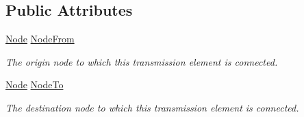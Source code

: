 \subsection*{Public Attributes}
\begin{DoxyCompactItemize}
\item 
\hyperlink{class_power_system_planning_1_1_node}{Node} \hyperlink{class_power_system_planning_1_1_transmission_element_a361691d8c6720d32ab4e2be4e77233b3}{Node\+From}
\begin{DoxyCompactList}\small\item\em The origin node to which this transmission element is connected. \end{DoxyCompactList}\item 
\hyperlink{class_power_system_planning_1_1_node}{Node} \hyperlink{class_power_system_planning_1_1_transmission_element_adfffaeb9dab17f7f2bafec0f319b2fe5}{Node\+To}
\begin{DoxyCompactList}\small\item\em The destination node to which this transmission element is connected. \end{DoxyCompactList}\end{DoxyCompactItemize}
